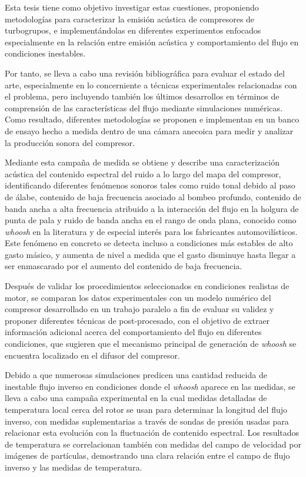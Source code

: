 Esta tesis tiene como objetivo investigar estas cuestiones, proponiendo metodologías para caracterizar la emisión acústica de compresores de turbogrupos, e implementándolas en diferentes experimentos enfocados especialmente en la relación entre emisión acústica y comportamiento del flujo en condiciones inestables.

Por tanto, se lleva a cabo una revisión bibliográfica para evaluar el estado del arte, especialmente en lo concerniente a técnicas experimentales relacionadas con el problema, pero incluyendo también los últimos desarrollos en términos de comprensión de las características del flujo mediante simulaciones numéricas. Como resultado, diferentes metodologías se proponen e implementan en un banco de ensayo hecho a medida dentro de una cámara anecoica para medir y analizar la producción sonora del compresor.

Mediante esta campaña de medida se obtiene y describe una caracterización acústica del contenido espectral del ruido a lo largo del mapa del compresor, identificando diferentes fenómenos sonoros tales como ruido tonal debido al paso de álabe, contenido de baja frecuencia asociado al bombeo profundo, contenido de banda ancha a alta frecuencia atribuido a la interacción del flujo en la holgura de punta de pala y ruido de banda ancha en el rango de onda plana, conocido como \emph{whoosh} en la literatura y de especial interés para los fabricantes automovilísticos. Este fenómeno en concreto se detecta incluso a condiciones más estables de alto gasto másico, y aumenta de nivel a medida que el gasto disminuye hasta llegar a ser enmascarado por el aumento del contenido de baja frecuencia.

Después de validar los procedimientos seleccionados en condiciones realistas de motor, se comparan los datos experimentales con un modelo numérico del compresor desarrollado en un trabajo paralelo a fin de evaluar su validez y proponer diferentes técnicas de post-procesado, con el objetivo de extraer información adicional acerca del comportamiento del flujo en diferentes condiciones, que sugieren que el mecanismo principal de generación de \emph{whoosh} se encuentra localizado en el difusor del compresor.

Debido a que numerosas simulaciones predicen una cantidad reducida de inestable flujo inverso en condiciones donde el \emph{whoosh} aparece en las  medidas, se lleva a cabo una campaña experimental en la cual medidas detalladas de temperatura local cerca del rotor se usan para determinar la longitud del flujo inverso, con medidas suplementarias a través de sondas de presión usadas para relacionar esta evolución con la fluctuación de contenido espectral. Los resultados de temperatura se correlacionan también con medidas del campo de velocidad por imágenes de partículas, demostrando una clara relación entre el campo de flujo inverso y las medidas de temperatura.

